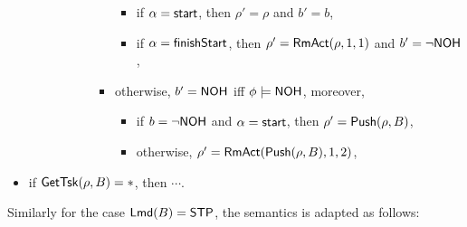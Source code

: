\begin{itemize}
\begin{itemize}
\begin{itemize}
\begin{itemize}
\begin{itemize}
					\begin{itemize}
						\item if $\alpha = {\mathsf{start} }$, then $\rho' = \rho$ and $b' = b$, 
						\item if $\alpha = {\mathsf{finishStart} }$, then $\rho' = \mathsf{RmAct}(\rho, 1, 1)$ and $b' = \neg{\sf NOH}$, 
					\end{itemize}
                    \item otherwise, $b' = {\sf NOH}$ iff $\phi \models {\sf NOH}$, moreover, 
                    \begin{itemize}
                        \item if $b = \neg {\sf NOH}$ and $\alpha = {\mathsf{start} }$, then $\rho'=\mathsf{Push}(\rho, B)$,
                        \item otherwise, $\rho' = \mathsf{RmAct}(\mathsf{Push}(\rho, B), 1, 2)$, 
                    \end{itemize}
            \end{itemize}
        \end{itemize}
    \end{itemize}
\end{itemize}
\item if $\mathsf{GetTsk}(\rho, B) = *$, then $\cdots$. 
\end{itemize}

Similarly for the case ${\sf Lmd}(B) = {\sf STP}$, the semantics is adapted as follows:

